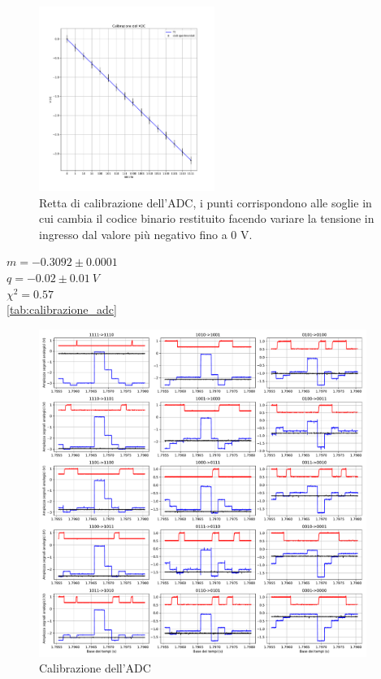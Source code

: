 \documentclass[journal]{IEEEtran}
\begin{document}
\begin{figure}[t]%
\centering
\begin{center}
\includegraphics[width=0.51\textwidth]{analysis/output/calibrazione_adc.pdf}
\end{center}
\caption{Retta di calibrazione dell'ADC, i punti corrispondono alle soglie in cui cambia il codice binario restituito facendo variare la tensione in ingresso dal valore più negativo fino a 0 V.}
\label{fig:graph_calibrazione_adc}
\end{figure}

$ m = -0.3092 \pm 0.0001 $ \\
$ q = -0.02 \pm 0.01 \ V$ \\
$ \chi^{2} = 0.57 $ \\

\ref{tab:calibrazione_adc}

\begin{figure}[t]%
\centering
\includegraphics[trim = {30 0 50 0}, width=0.95\textwidth]{analysis/output/calibration.pdf}
\caption{Calibrazione dell'ADC}
\label{fig:waveforms_no_sh_scope}
\end{figure}
\end{document}
